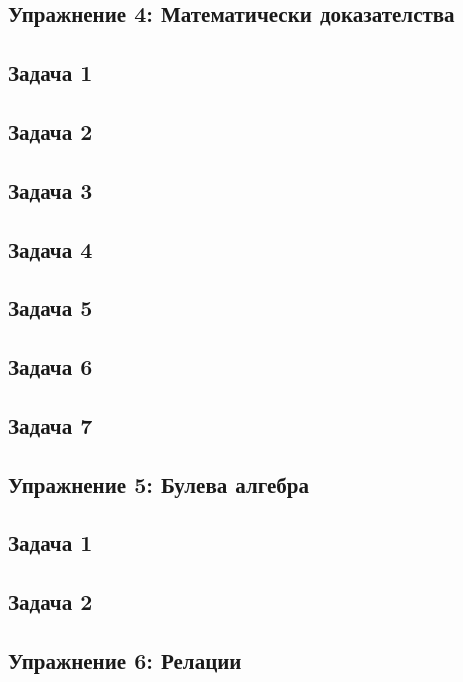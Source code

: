 \documentclass[fleqn, 12pt]{article}
\theoremstyle{definition}
\begin{document}
\newpage
\subsection{Упражнение 4: Математически доказателства}

\subsection*{Задача 1}

\subsection*{Задача 2}

\subsection*{Задача 3}

\subsection*{Задача 4}

\subsection*{Задача 5}

\subsection*{Задача 6}

\subsection*{Задача 7}

\newpage
\subsection{Упражнение 5: Булева алгебра}

\subsection*{Задача 1}

\subsection*{Задача 2}

\newpage
\subsection{Упражнение 6: Релации }
\end{document}
